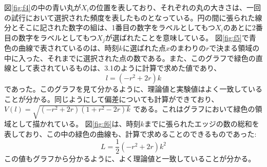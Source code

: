 図\ref{fig:f4}の中の青い丸が$X_{i}$の位置を表しており、それぞれの丸の大きさは、一回の試行において選択された頻度を表したものとなっている。円の間に張られた線分とそこに記された数字の組は、1番目の数字をラベルとしてもつ$X_{i}$のあとに2番目の数字をラベルとしてもつ$X_{j}$が選ばれたことを意味している。
図\ref{fig:f5}で青色の曲線で表されているのは、時刻$k$に選ばれた点$x$のまわりの$r$で決まる領域の中に入った、それまでに選択された点の数である。また、このグラフで緑色の直線として表されているものは、3.1のように計算で求めた値であり、
$$l = (-r^{2} + 2r)k$$
であった。このグラフを見て分かるように、理論値と実験値はよく一致していることが分かる。同じようにして偏差についても計算ができており、
$V(l) = \sqrt{(-r^{2} + 2r)(1+r^{2}-2r)k}$
である。これはグラフにおいて緑色の領域として描かれている。
図\ref{fig:f6}は、時刻$k$までに張られたエッジの数の総和を表しており、この中の緑色の曲線も、計算で求めることのできるものであった:
$$L = \frac{1}{2}(-r^{2} + 2r)k^{2}$$
この値もグラフから分かるように、よく理論値と一致していることが分かる。


